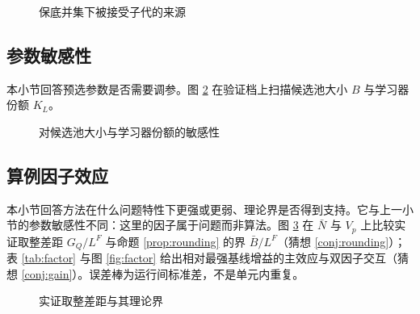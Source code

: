 \begin{figure}[htbp]
\caption{保底并集下被接受子代的来源}\label{fig:safeguard}
\end{figure}

\subsection{参数敏感性}\label{sec:sensitivity}
本小节回答预选参数是否需要调参。图 \ref{fig:sens} 在验证档上扫描候选池大小 $B$ 与学习器份额 $K_L$。

\begin{figure}[htbp]
\caption{对候选池大小与学习器份额的敏感性}\label{fig:sens}
\end{figure}

\subsection{算例因子效应}\label{sec:factor}
本小节回答方法在什么问题特性下更强或更弱、理论界是否得到支持。它与上一小节的参数敏感性不同：这里的因子属于问题而非算法。图 \ref{fig:rounding} 在 $\bar N$ 与 $V_p$ 上比较实证取整差距 $G_Q/L^F$ 与命题 \ref{prop:rounding} 的界 $\bar B/L^F$（猜想 \ref{conj:rounding}）；表 \ref{tab:factor} 与图 \ref{fig:factor} 给出相对最强基线增益的主效应与双因子交互（猜想 \ref{conj:gain}）。误差棒为运行间标准差，不是单元内重复。

\begin{table}[htbp]
\centering\small
\caption{主实验档的算例因子主效应（27 个参数各异的算例，每水平 9 个；误差为 \NumRuns{} 次运行的运行间标准差）}\label{tab:factor}

\end{table}

\begin{figure}[htbp]
\caption{实证取整差距与其理论界}\label{fig:rounding}
\end{figure}

